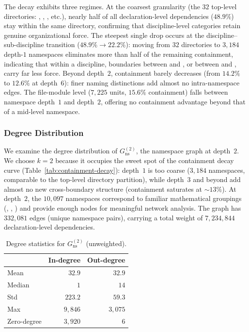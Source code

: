 The decay exhibits three regimes. At the coarsest granularity (the $32$ top-level directories: , , , etc.), nearly half of all declaration-level dependencies ($48.9\%$) stay within the same directory, confirming that discipline-level categories retain genuine organizational force. The steepest single drop occurs at the discipline--sub-discipline transition ($48.9\% \to 22.2\%$): moving from $32$ directories to $3{,}184$ depth-$1$ namespaces eliminates more than half of the remaining containment, indicating that within a discipline, boundaries between  and , or between  and , carry far less force. Beyond depth~$2$, containment barely decreases (from $14.2\%$ to $12.6\%$ at depth~$6$): finer naming distinctions add almost no intra-namespace edges. The file-module level ($7{,}225$ units, $15.6\%$ containment) falls between namespace depth~$1$ and depth~$2$, offering no containment advantage beyond that of a mid-level namespace.

\subsubsection{Degree Distribution}
\label{sec:ns-degree}

We examine the degree distribution of $G_{\mathrm{ns}}^{(2)}$, the namespace graph at depth~$2$. We choose $k = 2$ because it occupies the sweet spot of the containment decay curve (Table~\ref{tab:containment-decay}): depth~$1$ is too coarse ($3{,}184$ namespaces, comparable to the top-level directory partition), while depth~$3$ and beyond add almost no new cross-boundary structure (containment saturates at ${\sim}13\%$). At depth~$2$, the $10{,}097$ namespaces correspond to familiar mathematical groupings (, , ) and provide enough nodes for meaningful network analysis. The graph has $332{,}081$ edges (unique namespace pairs), carrying a total weight of $7{,}234{,}844$ declaration-level dependencies.

\begin{table}[ht]
\centering
\caption{Degree statistics for $G_{\mathrm{ns}}^{(2)}$ (unweighted).}
\label{tab:ns-degree-stats}
\begin{tabular}{lrr}
\toprule
& In-degree & Out-degree \\
\midrule
Mean        & $32.9$    & $32.9$ \\
Median      & $1$       & $14$ \\
Std         & $223.2$   & $59.3$ \\
Max         & $9{,}846$ & $3{,}075$ \\
Zero-degree & $3{,}920$ & $6$ \\
\bottomrule
\end{tabular}
\end{table}

